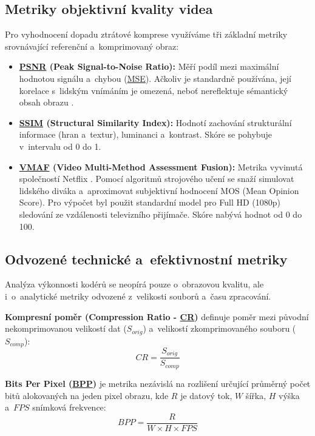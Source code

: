\documentclass[11pt,a4paper]{article}
\begin{document}
\subsection*{Metriky objektivní kvality videa}
\label{sec:metrics}
Pro vyhodnocení dopadu ztrátové komprese využíváme tři základní metriky srovnávající referenční a~komprimovaný obraz:

\begin{itemize}
    \item \textbf{\hyperref[sec:metrics]{PSNR} (Peak Signal-to-Noise Ratio):} Měří podíl mezi maximální hodnotou signálu a~chybou (\hyperref[sec:glossary]{MSE}). Ačkoliv je standardně používána, její korelace s~lidským vnímáním je omezená, neboť nereflektuje sémantický obsah obrazu \cite{lec_iqa, wang2004image}.
    \item \textbf{\hyperref[sec:metrics]{SSIM} (Structural Similarity Index):} Hodnotí zachování strukturální informace (hran a~textur), luminanci a~kontrast. Skóre se pohybuje v~intervalu od 0 do 1.
    \item \textbf{\hyperref[sec:metrics]{VMAF} (Video Multi-Method Assessment Fusion):} Metrika vyvinutá společností Netflix \cite{netflixVMAF}. Pomocí algoritmů strojového učení se snaží simulovat lidského diváka a~aproximovat subjektivní hodnocení MOS (Mean Opinion Score). Pro výpočet byl použit standardní model pro Full HD (1080p) sledování ze vzdálenosti televizního přijímače. Skóre nabývá hodnot od 0 do 100.
\end{itemize}

\subsection*{Odvozené technické a~efektivnostní metriky}
\label{sec:derived_metrics}
Analýza výkonnosti kodérů se neopírá pouze o~obrazovou kvalitu, ale i~o~analytické metriky odvozené z~velikosti souborů a~času zpracování. 

\textbf{Kompresní poměr (Compression Ratio - \hyperref[sec:derived_metrics]{CR})} definuje poměr mezi původní nekomprimovanou velikostí dat ($S_{orig}$) a~velikostí zkomprimovaného souboru ($S_{comp}$):
\begin{equation*}
    \hyperref[sec:derived_metrics]{CR} = \frac{S_{orig}}{S_{comp}}
\end{equation*}

\textbf{Bits Per Pixel (\hyperref[sec:derived_metrics]{BPP})} je metrika nezávislá na rozlišení určující průměrný počet bitů alokovaných na jeden pixel obrazu, kde $R$ je datový tok, $W$ šířka, $H$ výška a~$\hyperref[sec:derived_metrics]{FPS}$ snímková frekvence:
\begin{equation*}
    \hyperref[sec:derived_metrics]{BPP} = \frac{R}{W \times H \times \hyperref[sec:derived_metrics]{FPS}}
\end{equation*}
\end{document}
